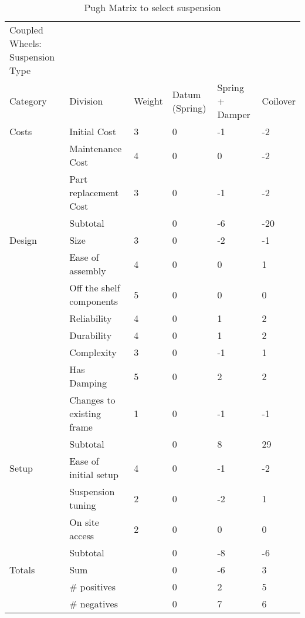  \begin{table}
\centering
\caption{Pugh Matrix to select suspension}
\begin{tabular}{| llllll |} \hline
Coupled Wheels: Suspension Type &  &  &  &  &  & \\
Category & Division & Weight & Datum (Spring) & Spring + Damper & Coilover & \\
Costs & Initial Cost & 3 & 0 & -1 & -2 & \\
 & Maintenance Cost & 4 & 0 & 0 & -2 & \\
 & Part replacement Cost & 3 & 0 & -1 & -2 & \\
 & Subtotal &  & 0 & -6 & -20 & \\
Design & Size & 3 & 0 & -2 & -1 & \\
 & Ease of assembly & 4 & 0 & 0 & 1 & \\
 & Off the shelf components & 5 & 0 & 0 & 0 & \\
 & Reliability & 4 & 0 & 1 & 2 & \\
 & Durability & 4 & 0 & 1 & 2 & \\
 & Complexity & 3 & 0 & -1 & 1 & \\
 & Has Damping & 5 & 0 & 2 & 2 & \\
 & Changes to existing frame & 1 & 0 & -1 & -1 & \\
 & Subtotal &  & 0 & 8 & 29 & \\
Setup & Ease of initial setup & 4 & 0 & -1 & -2 & \\
 & Suspension tuning & 2 & 0 & -2 & 1 & \\
 & On site access & 2 & 0 & 0 & 0 & \\
 & Subtotal &  & 0 & -8 & -6 & \\
Totals & Sum &  & 0 & -6 & 3 & \\
 & \# positives &  & 0 & 2 & 5 & \\
 & \# negatives &  & 0 & 7 & 6 & \\
 \end{tabular}
\label{tab:pugh_susp}
\end{table}


